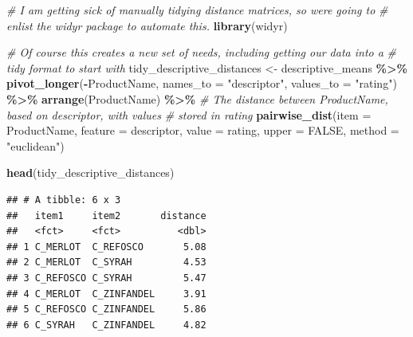 \documentclass[
]{book}
\newenvironment{Shaded}{\begin{snugshade}}{\end{snugshade}}
\newcommand{\AttributeTok}[1]{\textcolor[rgb]{0.13,0.29,0.53}{#1}}
\newcommand{\CommentTok}[1]{\textcolor[rgb]{0.56,0.35,0.01}{\textit{#1}}}
\newcommand{\ConstantTok}[1]{\textcolor[rgb]{0.56,0.35,0.01}{#1}}
\newcommand{\FunctionTok}[1]{\textcolor[rgb]{0.13,0.29,0.53}{\textbf{#1}}}
\newcommand{\NormalTok}[1]{#1}
\newcommand{\OtherTok}[1]{\textcolor[rgb]{0.56,0.35,0.01}{#1}}
\newcommand{\SpecialCharTok}[1]{\textcolor[rgb]{0.81,0.36,0.00}{\textbf{#1}}}
\newcommand{\StringTok}[1]{\textcolor[rgb]{0.31,0.60,0.02}{#1}}
\begin{document}
\begin{Shaded}
\begin{Highlighting}[]
\CommentTok{\# I am getting sick of manually tidying distance matrices, so we\textquotesingle{}re going to}
\CommentTok{\# enlist the \textasciigrave{}widyr\textasciigrave{} package to automate this.}
\FunctionTok{library}\NormalTok{(widyr)}

\CommentTok{\# Of course this creates a new set of needs, including getting our data into a}
\CommentTok{\# tidy format to start with}
\NormalTok{tidy\_descriptive\_distances }\OtherTok{\textless{}{-}} 
\NormalTok{  descriptive\_means }\SpecialCharTok{\%\textgreater{}\%}
  \FunctionTok{pivot\_longer}\NormalTok{(}\SpecialCharTok{{-}}\NormalTok{ProductName,}
               \AttributeTok{names\_to =} \StringTok{"descriptor"}\NormalTok{,}
               \AttributeTok{values\_to =} \StringTok{"rating"}\NormalTok{) }\SpecialCharTok{\%\textgreater{}\%}
  \FunctionTok{arrange}\NormalTok{(ProductName) }\SpecialCharTok{\%\textgreater{}\%}
  \CommentTok{\# The distance between \textasciigrave{}ProductName\textasciigrave{}, based on \textasciigrave{}descriptor\textasciigrave{}, with values}
  \CommentTok{\# stored in \textasciigrave{}rating\textasciigrave{}}
  \FunctionTok{pairwise\_dist}\NormalTok{(}\AttributeTok{item =}\NormalTok{ ProductName, }\AttributeTok{feature =}\NormalTok{ descriptor, }\AttributeTok{value =}\NormalTok{ rating,}
                \AttributeTok{upper =} \ConstantTok{FALSE}\NormalTok{, }\AttributeTok{method =} \StringTok{"euclidean"}\NormalTok{)}

\FunctionTok{head}\NormalTok{(tidy\_descriptive\_distances)}
\end{Highlighting}
\end{Shaded}

\begin{verbatim}
## # A tibble: 6 x 3
##   item1     item2       distance
##   <fct>     <fct>          <dbl>
## 1 C_MERLOT  C_REFOSCO       5.08
## 2 C_MERLOT  C_SYRAH         4.53
## 3 C_REFOSCO C_SYRAH         5.47
## 4 C_MERLOT  C_ZINFANDEL     3.91
## 5 C_REFOSCO C_ZINFANDEL     5.86
## 6 C_SYRAH   C_ZINFANDEL     4.82
\end{verbatim}
\end{document}
